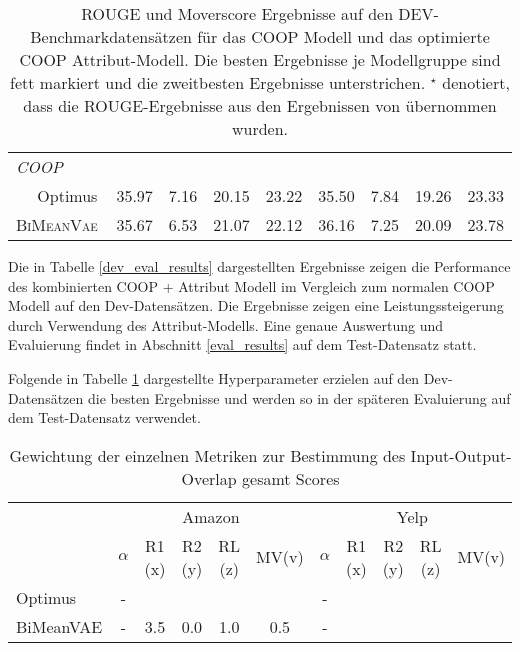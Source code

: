 \begin{table}[!h]
\begin{tabular}{@{}lcccccccc@{}}
    \textit{COOP}              &         &         &        &        &        & &   &    \\
    $\quad$ Optimus        & 35.97 & 7.16 & 20.15 & 23.22 & 35.50  & 7.84  & 19.26 & 23.33\\  %
    $\quad$ \textsc{BiMeanVae} &  35.67 &6.53 & 21.07 & 22.12 & 36.16	&7.25&20.09 & 23.78\\ 
    
    	\bottomrule
    
    \end{tabular}
    \caption{ROUGE und Moverscore Ergebnisse auf den DEV-Benchmarkdatensätzen für das COOP Modell und das optimierte COOP Attribut-Modell. Die besten Ergebnisse je Modellgruppe sind fett markiert und die zweitbesten Ergebnisse unterstrichen.
    $^{\star}$ denotiert, dass die ROUGE-Ergebnisse aus den Ergebnissen von \citep{coop} übernommen wurden.
    }
\end{table}

Die in Tabelle \ref{dev_eval_results} dargestellten Ergebnisse zeigen die Performance des kombinierten COOP + Attribut Modell im Vergleich zum normalen COOP Modell auf den Dev-Datensätzen.
Die Ergebnisse zeigen eine Leistungssteigerung durch Verwendung des Attribut-Modells. Eine genaue Auswertung und Evaluierung findet in Abschnitt \ref{eval_results} auf dem Test-Datensatz statt.

Folgende in Tabelle \ref{weight_mv} dargestellte Hyperparameter erzielen auf den Dev-Datensätzen die besten Ergebnisse und werden so in der späteren Evaluierung auf dem Test-Datensatz verwendet.

\begin{table}[h!]
    \centering
    \begin{tabular}{@{}lcccccccccc@{}}
    \toprule
    & \multicolumn{5}{c}{Amazon} & \multicolumn{5}{c}{Yelp} \\ 
             &$\alpha$ & R1 (x)  & R2 (y)  & RL (z) & MV(v)&$\alpha$ &  R1 (x)  & R2 (y)  & RL (z) & MV(v) \\ \midrule
    Optimus   &-&   &   &   &  &  - &   &&   &  \\
    BiMeanVAE &-& 3.5   & 0.0  &  1.0 & 0.5 & -&  &   &   &    \\ \bottomrule
    \end{tabular}
    \caption{Gewichtung der einzelnen Metriken zur Bestimmung des Input-Output-Overlap gesamt Scores}
    \label{weight_mv}
\end{table}

